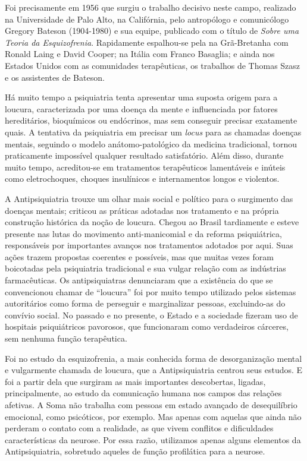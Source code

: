 Foi precisamente em 1956 que surgiu o trabalho decisivo neste campo,
realizado na Universidade de Palo Alto, na Califórnia, pelo antropólogo
e comunicólogo Gregory Bateson (1904-1980) e sua equipe, publicado com o
título de \emph{Sobre uma Teoria da Esquizofrenia}. Rapidamente
espalhou-se pela na Grã-Bretanha com Ronald Laing e David Cooper; na
Itália com Franco Basaglia; e ainda nos Estados Unidos com as
comunidades terapêuticas, os trabalhos de Thomas Szasz e os assistentes
de Bateson.

Há muito tempo a psiquiatria tenta apresentar uma suposta origem para a
loucura, caracterizada por uma doença da mente e influenciada por
fatores hereditários, bioquímicos ou endócrinos, mas sem conseguir
precisar exatamente quais. A tentativa da psiquiatria em precisar um
\emph{locus} para as chamadas doenças mentais, seguindo o modelo
anátomo-patológico da medicina tradicional, tornou praticamente
impossível qualquer resultado satisfatório. Além disso, durante muito
tempo, acreditou-se em tratamentos terapêuticos lamentáveis e inúteis
como eletrochoques, choques insulínicos e internamentos longos e
violentos.

A Antipsiquiatria trouxe um olhar mais social e político para o
surgimento das doenças mentais; criticou as práticas adotadas nos
tratamento e na própria construção histórica da noção de loucura. Chegou
ao Brasil tardiamente e esteve presente nas lutas do movimento
anti-manicomial e da reforma psiquiátrica, responsáveis por importantes
avanços nos tratamentos adotados por aqui. Suas ações trazem propostas
coerentes e possíveis, mas que muitas vezes foram boicotadas pela
psiquiatria tradicional e sua vulgar relação com as indústrias
farmacêuticas. Os antipsiquiatras denunciaram que a existência do que se
convencionou chamar de ``loucura'' foi por muito tempo utilizado pelos
sistemas autoritários como forma de perseguir e marginalizar pessoas,
excluindo-as do convívio social. No passado e no presente, o Estado e a
sociedade fizeram uso de hospitais psiquiátricos pavorosos, que
funcionaram como verdadeiros cárceres, sem nenhuma função terapêutica.

Foi no estudo da esquizofrenia, a mais conhecida forma de desorganização
mental e vulgarmente chamada de loucura, que a Antipsiquiatria centrou
seus estudos. E foi a partir dela que surgiram as mais importantes
descobertas, ligadas, principalmente, ao estudo da comunicação humana
nos campos das relações afetivas. A Soma não trabalha com pessoas em
estado avançado de desequilíbrio emocional, como psicóticos, por
exemplo. Mas apenas com aquelas que ainda não perderam o contato com a
realidade, as que vivem conflitos e dificuldades características da
neurose. Por essa razão, utilizamos apenas alguns elementos da
Antipsiquiatria, sobretudo aqueles de função profilática para a neurose.

